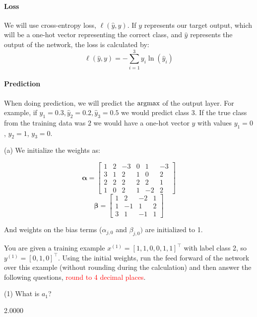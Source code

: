 \paragraph{Loss}

We will use cross-entropy loss, $\ell(\hat{y},y)$. If $y$ represents our target output, which will be a one-hot vector representing the correct class, and $\hat{y}$ represents the output of the network, the loss is calculated by:
$$\ell(\hat{y},y) = - \sum_{i=1}^3 y_i \ln(\hat{y}_i)$$

\paragraph{Prediction}
When doing prediction, we will predict the $\mathop{\rm argmax}$ of the output layer. For example, if $\hat{y}_1=0.3, \hat{y}_2=0.2, \hat{y}_3=0.5$ we would predict class 3. If the true class from the training data was $2$ we would have a one-hot vector $y$ with values $y_1=0$, $y_2=1$, $y_3=0$.

(a)  We initialize the weights as:
\begin{center}
$$\boldsymbol{\alpha}=
    \begin{bmatrix}
    1 & 2 & -3 & 0 & 1 & -3 \\
    3 & 1 & 2 & 1 & 0 & 2 \\
    2 & 2 & 2 & 2 & 2 & 1 \\
    1 & 0 & 2 & 1 & -2 & 2
    \end{bmatrix}$$
$$\boldsymbol{\beta}=
    \begin{bmatrix}
    1 & 2 & -2 & 1 \\
    1 & -1 & 1 & 2 \\
    3 & 1 & -1 & 1
    \end{bmatrix}
$$
\end{center}

And weights on the bias terms (${\alpha}_{j,0}$ and ${\beta}_{j,0})$ are initialized to 1.

You are given a training example $x^{(1)}=[1,1,0,0,1,1]^{\top}$ with label class 2, so $y^{(1)}=[0,1,0]^{\top}$. Using the initial weights, run the feed forward of the network over this example (without rounding during the calculation) and then answer the following questions, \textcolor{red}{round to 4 decimal places}.

(1) What is $a_1$?
\begin{tcolorbox}[fit,height=1cm, width=2cm, blank, borderline={1pt}{-2pt}]
    2.0000
\end{tcolorbox}

